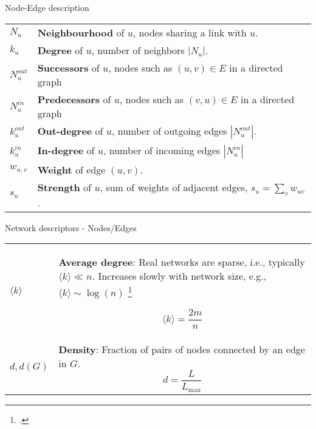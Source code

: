 \begin{textbox}{Node-Edge description}
    \begin{tabular}{p{}|p{}}\scriptsize
        $N_u$       & \textbf{Neighbourhood} of $u$, nodes sharing a link with $u$.                      \\

        $k_u$       & \textbf{Degree} of $u$, number of neighbors $|N_u|$.                               \\
        \hline
        $N^{out}_u$ & \textbf{Successors} of $u$, nodes such as $(u,v)\in E$ in a directed graph         \\

        $N^{in}_u$  & \textbf{Predecessors} of $u$, nodes such as $(v,u)\in E$ in a directed graph       \\

        $k^{out}_u$ & \textbf{Out-degree} of $u$, number of outgoing edges  $|N^{out}_u|$.               \\

        $k^{in}_u$  & \textbf{In-degree} of $u$, number of incoming edges $|N^{in}_u|$                   \\
        \hline
        $w_{u,v}$   & \textbf{Weight} of edge $(u,v)$.                                                   \\

        $s_u$       & \textbf{Strength} of $u$, sum of weights of adjacent edges, $s_u = \sum_v w_{uv}$. \\
    \end{tabular}
\end{textbox}


\begin{textbox}{Network descriptors - Nodes/Edges}
    \begin{tabular}{p{}|p{}}\scriptsize
        $\langle k \rangle$ & \textbf{Average degree}:
        Real networks are sparse, i.e., typically $\langle k \rangle \ll n$. Increases slowly with network size, e.g., $\langle k \rangle \sim \log(n)$ \footcite{leskovec2005graphs}

        \[\langle k \rangle=\frac{2m}{n}\]                                                              \\

        $d,d(G)$            & \textbf{Density}: Fraction of pairs of nodes connected by an edge in $G$.
        \[
            d=\frac{L}{L_{\max}}
        \]                                                                                              \\
    \end{tabular}
\end{textbox}


